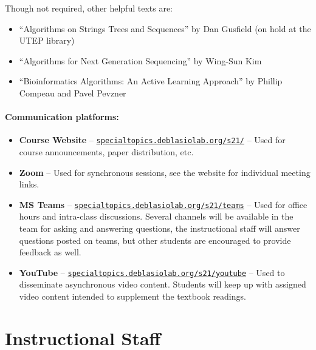 \documentclass[12pt]{scrartcl}
\begin{document}
Though not required, other helpful texts are:
\begin{itemize}
\item ``Algorithms on Strings Trees and Sequences'' by Dan Gusfield (on hold at the UTEP library)
\item ``Algorithms for Next Generation Sequencing'' by Wing-Sun Kim
\item ``Bioinformatics Algorithms: An Active Learning Approach'' by Phillip Compeau and Pavel Pevzner 
\end{itemize}


\paragraph{Communication platforms:}
\begin{itemize}
\item \textbf{Course Website} -- \href{https://specialtopics.deblasiolab.org/s21/}{\texttt{specialtopics.deblasiolab.org/s21/}} -- Used for course announcements, paper distribution, etc. 
\item \textbf{Zoom}  -- Used for synchronous sessions, see the website for individual meeting links. 
\item \textbf{MS Teams} -- \href{https://specialtopics.deblasiolab.org/s21/teams}{\texttt{specialtopics.deblasiolab.org/s21/teams}}  -- Used for office hours and intra-class discussions. Several channels will be available in the team for asking and answering questions, the instructional staff will answer questions posted on teams, but other students are encouraged to provide feedback as well. 
\item \textbf{YouTube} -- \href{https://specialtopics.deblasiolab.org/s21/youtube}{\texttt{specialtopics.deblasiolab.org/s21/youtube}} -- Used to disseminate asynchronous video content. Students will keep up with assigned video content intended to supplement the textbook readings.
\end{itemize}


\section{Instructional Staff}
\end{document}
